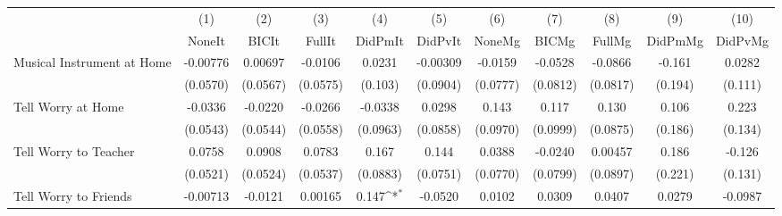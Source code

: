 {
\def\sym#1{\ifmmode^{#1}\else\(^{#1}\)\fi}
\begin{tabular}{l*{10}{c}}
\toprule
            &\multicolumn{1}{c}{(1)}&\multicolumn{1}{c}{(2)}&\multicolumn{1}{c}{(3)}&\multicolumn{1}{c}{(4)}&\multicolumn{1}{c}{(5)}&\multicolumn{1}{c}{(6)}&\multicolumn{1}{c}{(7)}&\multicolumn{1}{c}{(8)}&\multicolumn{1}{c}{(9)}&\multicolumn{1}{c}{(10)}\\
            &\multicolumn{1}{c}{NoneIt}&\multicolumn{1}{c}{BICIt}&\multicolumn{1}{c}{FullIt}&\multicolumn{1}{c}{DidPmIt}&\multicolumn{1}{c}{DidPvIt}&\multicolumn{1}{c}{NoneMg}&\multicolumn{1}{c}{BICMg}&\multicolumn{1}{c}{FullMg}&\multicolumn{1}{c}{DidPmMg}&\multicolumn{1}{c}{DidPvMg}\\
\midrule
Musical Instrument at Home&    -0.00776         &     0.00697         &     -0.0106         &      0.0231         &    -0.00309         &     -0.0159         &     -0.0528         &     -0.0866         &      -0.161         &      0.0282         \\
            &    (0.0570)         &    (0.0567)         &    (0.0575)         &     (0.103)         &    (0.0904)         &    (0.0777)         &    (0.0812)         &    (0.0817)         &     (0.194)         &     (0.111)         \\
\addlinespace
Tell Worry at Home&     -0.0336         &     -0.0220         &     -0.0266         &     -0.0338         &      0.0298         &       0.143         &       0.117         &       0.130         &       0.106         &       0.223         \\
            &    (0.0543)         &    (0.0544)         &    (0.0558)         &    (0.0963)         &    (0.0858)         &    (0.0970)         &    (0.0999)         &    (0.0875)         &     (0.186)         &     (0.134)         \\
\addlinespace
Tell Worry to Teacher&      0.0758         &      0.0908         &      0.0783         &       0.167         &       0.144         &      0.0388         &     -0.0240         &     0.00457         &       0.186         &      -0.126         \\
            &    (0.0521)         &    (0.0524)         &    (0.0537)         &    (0.0883)         &    (0.0751)         &    (0.0770)         &    (0.0799)         &    (0.0897)         &     (0.221)         &     (0.131)         \\
\addlinespace
Tell Worry to Friends&    -0.00713         &     -0.0121         &     0.00165         &       0.147\sym{*}  &     -0.0520         &      0.0102         &      0.0309         &      0.0407         &      0.0279         &     -0.0987         \\

\end{tabular}}
